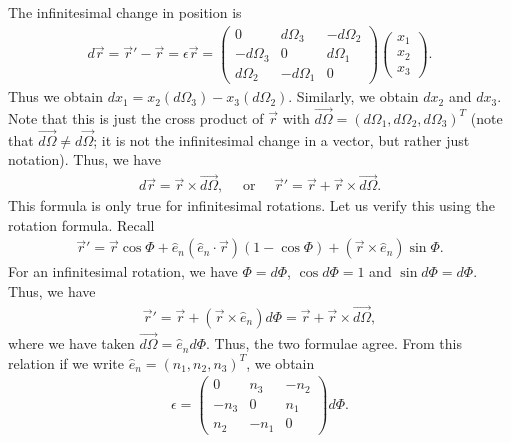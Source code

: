 The infinitesimal change in position is
\begin{align}
    d\vec{r} = \vec{r}' - \vec{r} = \epsilon \vec{r} = \begin{pmatrix}
        0 & d\Omega_{3} & -d\Omega_{2} \\
        -d\Omega_{3} & 0 & d\Omega_{1} \\
        d\Omega_{2} & -d\Omega_{1} & 0
    \end{pmatrix} \begin{pmatrix}
        x_{1} \\ x_{2} \\ x_{3}
    \end{pmatrix}.
\end{align}
Thus we obtain $dx_{1} = x_{2}(d\Omega_{3}) - x_{3}(d\Omega_{2})$. Similarly, we obtain $dx_{2}$ and $dx_{3}$. Note that this is just the cross product of $\vec{r}$ with $\vec{d\Omega} = (d\Omega_{1},d\Omega_{2},d\Omega_{3})^{T}$ (note that $\vec{d\Omega} \neq d\vec{\Omega}$; it is not the infinitesimal change in a vector, but rather just notation). Thus, we have
\begin{align}
    d \vec{r} = \vec{r} \times \vec{d\Omega}, \quad \text{ or } \quad \vec{r}' = \vec{r} + \vec{r} \times \vec{d\Omega}.
\end{align}
This formula is only true for infinitesimal rotations. Let us verify this using the rotation formula. Recall
\begin{align}
    \vec{r}' = \vec{r} \cos \Phi + \hat{e}_{n}(\hat{e}_{n} \cdot \vec{r}) (1-\cos \Phi) + (\vec{r} \times \hat{e}_{n}) \sin \Phi.
\end{align}
For an infinitesimal rotation, we have $\Phi = d\Phi$, $\cos d\Phi = 1$ and $\sin d\Phi = d\Phi$. Thus, we have
\begin{align}
    \vec{r}' = \vec{r} + (\vec{r} \times \hat{e}_{n}) d \Phi = \vec{r} + \vec{r} \times \vec{d\Omega},
\end{align}
where we have taken $\vec{d\Omega} = \hat{e}_{n} d\Phi$. Thus, the two formulae agree. From this relation if we write $\hat{e}_{n} = (n_{1},n_{2},n_{3})^{T}$, we obtain
\begin{align}
    \epsilon = \begin{pmatrix}
        0 & n_{3} & -n_{2} \\
        -n_{3} & 0 & n_{1} \\
        n_{2} & -n_{1} & 0
    \end{pmatrix}d\Phi.
\end{align}

